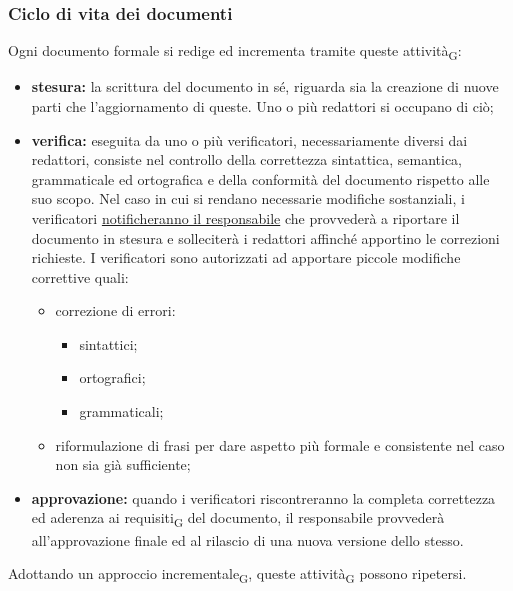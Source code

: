     \subsubsection{Ciclo di vita dei documenti}
    \label{ciclovitadoc}
    Ogni documento formale si redige ed incrementa tramite queste attività\textsubscript{G}:
    \begin{itemize}
        \item \textbf{stesura: }la scrittura del documento in sé, riguarda sia la creazione di nuove parti che l'aggiornamento di queste. Uno o più redattori si occupano di ciò;
        \item \textbf{verifica: }eseguita da uno o più verificatori, necessariamente diversi dai redattori, consiste nel controllo della correttezza sintattica, semantica, grammaticale ed ortografica e della conformità del documento rispetto alle suo scopo. Nel caso in cui si rendano necessarie modifiche sostanziali, i verificatori \hyperref[risoluzioneproblemi]{notificheranno il responsabile} che provvederà a riportare il documento in stesura e solleciterà i redattori affinché apportino le correzioni richieste. I verificatori sono autorizzati ad apportare piccole modifiche correttive quali:
        \begin{itemize}
            \item correzione di errori:
                \begin{itemize}
                    \item sintattici;
                    \item ortografici;
                    \item grammaticali;
                \end{itemize}

            \item riformulazione di frasi per dare aspetto più formale e consistente nel caso non sia già sufficiente;
        \end{itemize}
        \item \textbf{approvazione: }quando i verificatori riscontreranno la completa correttezza ed aderenza ai requisiti\textsubscript{G} del documento, il responsabile provvederà all'approvazione finale ed al rilascio di una nuova versione dello stesso.
    \end{itemize}
    Adottando un approccio incrementale\textsubscript{G}, queste attività\textsubscript{G} possono ripetersi.
